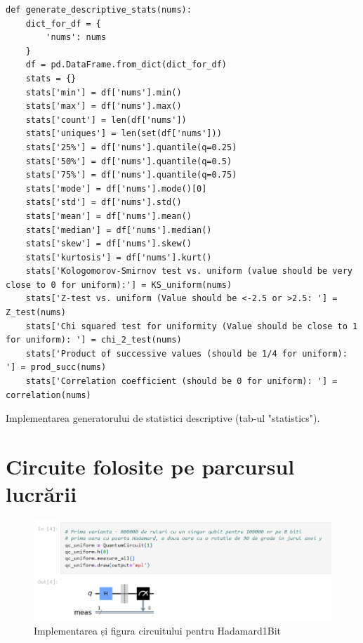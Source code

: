 \begin{code}
\begin{verbatim}
def generate_descriptive_stats(nums):
    dict_for_df = {
        'nums': nums
    }
    df = pd.DataFrame.from_dict(dict_for_df)
    stats = {}
    stats['min'] = df['nums'].min()
    stats['max'] = df['nums'].max()
    stats['count'] = len(df['nums'])
    stats['uniques'] = len(set(df['nums']))
    stats['25%'] = df['nums'].quantile(q=0.25)
    stats['50%'] = df['nums'].quantile(q=0.5)
    stats['75%'] = df['nums'].quantile(q=0.75)
    stats['mode'] = df['nums'].mode()[0]
    stats['std'] = df['nums'].std()
    stats['mean'] = df['nums'].mean()
    stats['median'] = df['nums'].median()
    stats['skew'] = df['nums'].skew()
    stats['kurtosis'] = df['nums'].kurt()
    stats['Kologomorov-Smirnov test vs. uniform (value should be very close to 0 for uniform):'] = KS_uniform(nums)
    stats['Z-test vs. uniform (Value should be <-2.5 or >2.5: '] = Z_test(nums)
    stats['Chi squared test for uniformity (Value should be close to 1 for uniform): '] = chi_2_test(nums)
    stats['Product of successive values (should be 1/4 for uniform): '] = prod_succ(nums)
    stats['Correlation coefficient (should be 0 for uniform): '] = correlation(nums)
\end{verbatim}
\caption{Implementarea generatorului de statistici descriptive (tab-ul "statistics").}
\end{code}

\newpage

\section{Circuite folosite pe parcursul lucrării}
\label{anexa4:circuite}
\begin{figure}[H]
    \centering
    \includegraphics[width=1.0\textwidth]{anexe/figuri/CircuitHadamard1.png}
    \caption{Implementarea și figura circuitului pentru Hadamard1Bit}
    \label{fig:CircuitHadamard1BitAnexa}
\end{figure}

